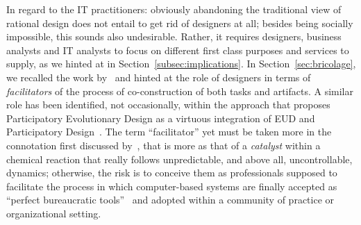 \documentclass{article}
\begin{document}
In regard to the IT practitioners: obviously abandoning the traditional view of rational design does not entail to get rid of designers at all; besides being socially impossible, this sounds also undesirable. Rather, it requires designers, business analysts and IT analysts to focus on different first class purposes and services to supply, as we hinted at in Section~\ref{subsec:implications}. In Section~\ref{sec:bricolage}, we recalled the work by~\citet{hartswood_being_2000} and hinted at the role of designers in terms of \emph{facilitators} of the process of co-construction of both tasks and artifacts. A similar role has been identified, not occasionally, within the approach that proposes Participatory Evolutionary Design as a virtuous integration of EUD and Participatory Design~\citep{sumner_evolution_1997}. The term ``facilitator'' yet must be taken more in the connotation first discussed by~\citet{hirschheim_four_1989}, that is more as that of a \emph{catalyst} within a chemical reaction that really follows unpredictable, and above all, uncontrollable, dynamics; otherwise, the risk is to conceive them as professionals supposed to facilitate the process in which computer-based systems are finally accepted as ``perfect bureaucratic tools''~\citep{harris_better_1999} and adopted within a community of practice or organizational setting. 
\end{document}
